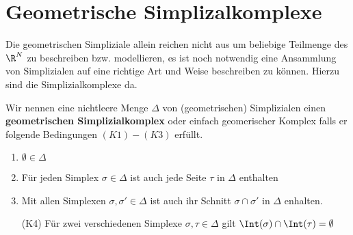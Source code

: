 
\section{Geometrische Simplizalkomplexe}

Die geometrischen Simpliziale allein reichen nicht aus um beliebige
Teilmenge des $\R^N$ zu beschreiben bzw. modellieren, es ist noch
notwendig eine Ansammlung von Simplizialen auf eine richtige Art und
Weise beschreiben zu können. Hierzu sind die Simplizialkomplexe da.

\begin{Def}
  Wir nennen eine nichtleere Menge $\Delta$ von (geometrischen) Simplizialen
  einen \textbf{geometrischen Simplizialkomplex} oder einfach
  geomerischer Komplex falls er folgende Bedingungen $(K1) - (K3)$
  erfüllt.
  \begin{enumerate}[(K1)]
  \item $\emptyset \in \Delta$
  \item Für jeden Simplex $\sigma \in \Delta$ ist auch jede Seite
    $\tau$ in $\Delta$ enthalten
  \item Mit allen Simplexen $\sigma, \sigma' \in \Delta$ ist auch ihr
    Schnitt $\sigma \cap \sigma'$ in $\Delta$ enhalten.
  \item[(K4)] Für zwei verschiedenen Simplexe $\sigma,\tau \in \Delta$
    gilt $\Int(\sigma) \cap \Int(\tau) = \emptyset$
  \end{enumerate}
\end{Def}


